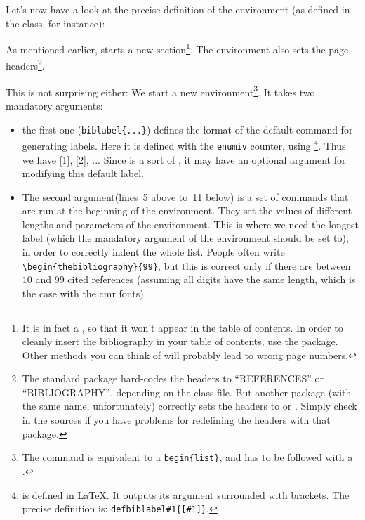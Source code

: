 \medskip
Let's now have a look at the precise definition of the
 environment (as defined in the 
class, for instance):
\begin{listing}{1}
\newenvironment{thebibliography}[1]
     {\section*{\refname
        \@mkboth{\MakeUppercase\refname}{\MakeUppercase\refname}}%
\end{listing}
As mentioned earlier,  starts a new
section\footnote{It is in fact a , so that it won't
  appear in the table of contents. In order to cleanly insert the
  bibliography in your table of contents, use the 
  package. Other methods you can think of will probably lead to wrong
  page numbers.}. The environment also sets the page headers\footnote{The
  standard  
   package hard-codes the headers to ``REFERENCES'' or
  ``BIBLIOGRAPHY'', depending on the class file. 
  But another package (with the same name, unfortunately) correctly sets
  the headers to  or . Simply check in the sources if you have
  problems for redefining the headers with that package.}.

\begin{listingcont}
      \list{\@biblabel{\@arabic\c@enumiv}}%
           {\settowidth{}%
\end{listingcont}
This is not surprising either: We start a new 
environment\footnote{The  command is equivalent to a
  \texttt{\bs begin\{list\}}, and has to be followed with a
  .}. It takes two mandatory arguments: 
\begin{itemize}
\item the first one (\texttt{\bs\at biblabel\{...\}}) defines the format of
the default command for 
  generating labels. Here it is defined with the \verb+enumiv+
  counter, using \footnote{ is
  defined in \LaTeX. It outputs its argument surrounded with
  brackets. The precise definition is:
\texttt{\bs def\bs\at biblabel\#1\{[\#1]\}}.}. 
 Thus we have [1], [2], ... Since  is a sort of
  , it may have an optional argument for modifying this
  default label. 
\item The second argument(lines~5 above to~11 below) is a set of commands that
  are run at  the 
  beginning of the environment. They set the values
  of different lengths and parameters of the  environment.
  This is where we need the longest label (which the mandatory
  argument of the  environment should be set to),
  in order to correctly  indent the whole list.
  People often write \verb+\begin{thebibliography}{99}+, but this is
  correct only if there are between $10$ and $99$ cited references
  (assuming all digits have the same length, which is the case with
  the   \textsf{cmr} fonts). 
\end{itemize}


